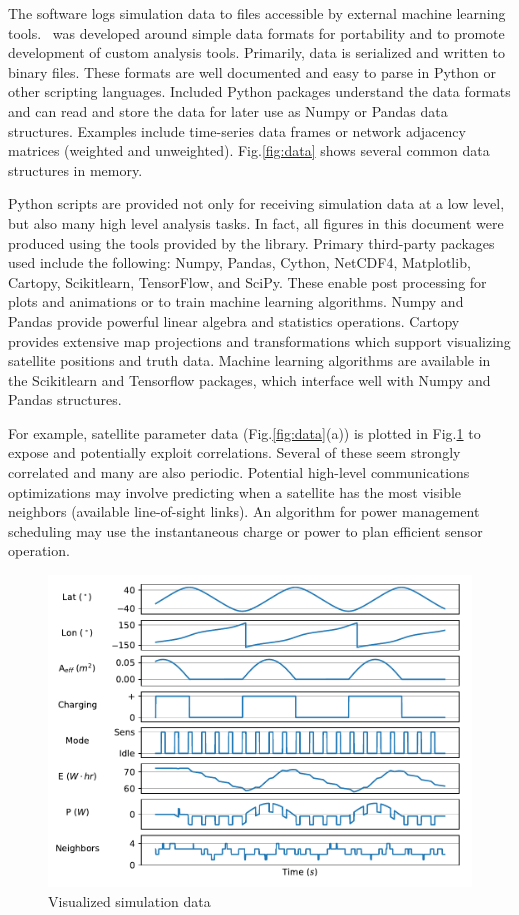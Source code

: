 \documentclass[conference]{IEEEtran}
\newcommand{\project}{{\sc{Collaborate}}~}
\begin{document}
The software logs simulation data to files accessible by external machine learning tools.  \project was developed around simple data formats for portability and to promote development of custom analysis tools.  Primarily, data is serialized and written to binary files.  These formats are well documented and easy to parse in Python or other scripting languages.  Included Python packages understand the data formats and can read and store the data for later use as Numpy or Pandas data structures.  Examples include time-series data frames or network adjacency matrices (weighted and unweighted).  Fig.\ref{fig:data} shows several common data structures in memory.

Python scripts are provided not only for receiving simulation data at a low level, but also many high level analysis tasks.  In fact, all figures in this document were produced using the tools provided by the library.  Primary third-party packages used include the following: Numpy, Pandas, Cython, NetCDF4, Matplotlib, Cartopy, Scikitlearn, TensorFlow, and SciPy.  These enable post processing for plots and animations or to train machine learning algorithms.  Numpy and Pandas provide powerful linear algebra and statistics operations.  Cartopy provides extensive map projections and transformations which support visualizing satellite positions and truth data.  Machine learning algorithms are available in the Scikitlearn and Tensorflow packages, which interface well with Numpy and Pandas structures.

For example, satellite parameter data (Fig.\ref{fig:data}(a)) is plotted in Fig.\ref{fig:processing} to expose and potentially exploit correlations.  Several of these seem strongly correlated and many are also periodic.  Potential high-level communications optimizations may involve predicting when a satellite has the most visible neighbors (available line-of-sight links).  An algorithm for power management scheduling may use the instantaneous charge or power to plan efficient sensor operation.

\begin{figure}[t]
  \begin{center}
    \includegraphics[width=\linewidth]{images/param_plot.pdf}
  \end{center}
  \caption{Visualized simulation data}
  \label{fig:processing}
\end{figure}
\end{document}
